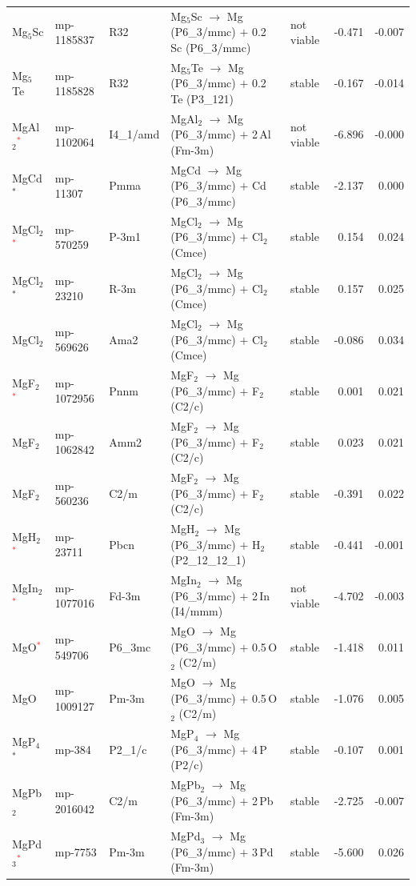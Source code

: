 \begin{longtable}{@{}ll l@{\hspace{4pt}} p{4.6cm} l@{\hspace{4pt}} rr@{}}
Mg$_{5}$Sc & mp-1185837 & R32 & Mg$_{5}$Sc $\to$ Mg (P6\_3/mmc) $+$ 0.2\,Sc (P6\_3/mmc) & not viable & -0.471 & -0.007 \\
Mg$_{5}$Te & mp-1185828 & R32 & Mg$_{5}$Te $\to$ Mg (P6\_3/mmc) $+$ 0.2\,Te (P3\_121) & stable & -0.167 & -0.014 \\
MgAl$_{2}$\textcolor{red}{$^*$} & mp-1102064 & I4\_1/amd & MgAl$_{2}$ $\to$ Mg (P6\_3/mmc) $+$ 2\,Al (Fm-3m) & not viable & -6.896 & -0.000 \\
MgCd$^*$ & mp-11307 & Pmma & MgCd $\to$ Mg (P6\_3/mmc) $+$ Cd (P6\_3/mmc) & stable & -2.137 & 0.000 \\
MgCl$_{2}$\textcolor{red}{$^*$} & mp-570259 & P-3m1 & MgCl$_{2}$ $\to$ Mg (P6\_3/mmc) $+$ Cl$_{2}$ (Cmce) & stable & 0.154 & 0.024 \\
MgCl$_{2}$$^*$ & mp-23210 & R-3m & MgCl$_{2}$ $\to$ Mg (P6\_3/mmc) $+$ Cl$_{2}$ (Cmce) & stable & 0.157 & 0.025 \\
MgCl$_{2}$ & mp-569626 & Ama2 & MgCl$_{2}$ $\to$ Mg (P6\_3/mmc) $+$ Cl$_{2}$ (Cmce) & stable & -0.086 & 0.034 \\
MgF$_{2}$\textcolor{red}{$^*$} & mp-1072956 & Pnnm & MgF$_{2}$ $\to$ Mg (P6\_3/mmc) $+$ F$_{2}$ (C2/c) & stable & 0.001 & 0.021 \\
MgF$_{2}$ & mp-1062842 & Amm2 & MgF$_{2}$ $\to$ Mg (P6\_3/mmc) $+$ F$_{2}$ (C2/c) & stable & 0.023 & 0.021 \\
MgF$_{2}$ & mp-560236 & C2/m & MgF$_{2}$ $\to$ Mg (P6\_3/mmc) $+$ F$_{2}$ (C2/c) & stable & -0.391 & 0.022 \\
MgH$_{2}$\textcolor{red}{$^*$} & mp-23711 & Pbcn & MgH$_{2}$ $\to$ Mg (P6\_3/mmc) $+$ H$_{2}$ (P2\_12\_12\_1) & stable & -0.441 & -0.001 \\
MgIn$_{2}$\textcolor{red}{$^*$} & mp-1077016 & Fd-3m & MgIn$_{2}$ $\to$ Mg (P6\_3/mmc) $+$ 2\,In (I4/mmm) & not viable & -4.702 & -0.003 \\
MgO\textcolor{red}{$^*$} & mp-549706 & P6\_3mc & MgO $\to$ Mg (P6\_3/mmc) $+$ 0.5\,O$_{2}$ (C2/m) & stable & -1.418 & 0.011 \\
MgO & mp-1009127 & Pm-3m & MgO $\to$ Mg (P6\_3/mmc) $+$ 0.5\,O$_{2}$ (C2/m) & stable & -1.076 & 0.005 \\
MgP$_{4}$$^*$ & mp-384 & P2\_1/c & MgP$_{4}$ $\to$ Mg (P6\_3/mmc) $+$ 4\,P (P2/c) & stable & -0.107 & 0.001 \\
MgPb$_{2}$ & mp-2016042 & C2/m & MgPb$_{2}$ $\to$ Mg (P6\_3/mmc) $+$ 2\,Pb (Fm-3m) & stable & -2.725 & -0.007 \\
MgPd$_{3}$\textcolor{red}{$^*$} & mp-7753 & Pm-3m & MgPd$_{3}$ $\to$ Mg (P6\_3/mmc) $+$ 3\,Pd (Fm-3m) & stable & -5.600 & 0.026 \\

\end{longtable}
